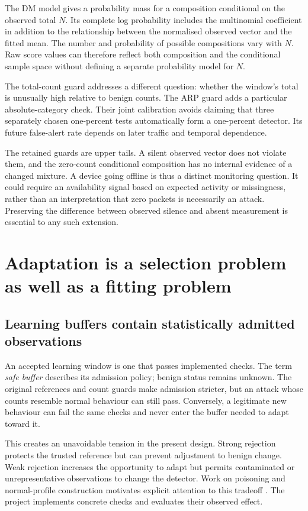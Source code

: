 The DM model gives a probability mass for a composition conditional
on the observed total $N$. Its complete log probability includes the
multinomial coefficient in addition to the relationship between the
normalised observed vector and the fitted mean. The number and
probability of possible compositions vary with $N$. Raw score values
can therefore reflect both composition and the conditional sample
space without defining a separate probability model for $N$.

The total-count guard addresses a different question: whether the
window's total is unusually high relative to benign counts. The ARP
guard adds a particular absolute-category check. Their joint
calibration avoids claiming that three separately chosen one-percent
tests automatically form a one-percent detector. Its future false-alert
rate depends on later traffic and temporal dependence.

The retained guards are upper tails. A silent observed vector does
not violate them, and the zero-count conditional composition has no
internal evidence of a changed mixture. A device going offline is
thus a distinct monitoring question. It could require an availability
signal based on expected activity or missingness, rather than an
interpretation that zero packets is necessarily an attack. Preserving
the difference between observed silence and absent measurement is
essential to any such extension.

\section{Adaptation is a selection problem as well as a fitting problem}
\label{sec:adaptation-discussion}

\subsection{Learning buffers contain statistically admitted observations}

An accepted learning window is one that passes implemented checks.
The term \emph{safe buffer} describes its admission policy; benign status
remains unknown. The original
references and count guards make admission stricter, but an attack
whose counts resemble normal behaviour can still pass. Conversely,
a legitimate new behaviour can fail the same checks and never enter
the buffer needed to adapt toward it.

This creates an unavoidable tension in the present design. Strong
rejection protects the trusted reference but can prevent adjustment
to benign change. Weak rejection increases the opportunity to
adapt but permits contaminated or unrepresentative observations to
change the detector. Work on poisoning and normal-profile construction
motivates explicit attention to this tradeoff
\cite{kloft2012,cretu2008}. The project implements concrete checks and
evaluates their observed effect.

